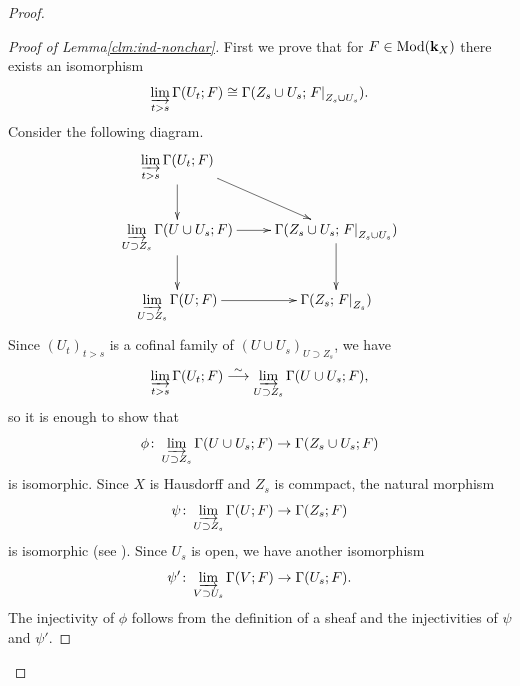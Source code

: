 \begin{proof}
  \begin{proof}[Proof of Lemma\ref{clm:ind-nonchar}]
    First we prove that 
    for \(F\in \Mod(\kk_X)\) 
    there exists an isomorphism
    \begin{equation}\label{eq:qis-claim}
      \indlim[t>s]\Gamma(U_t;F)
      \cong 
      \Gamma(Z_{s}\cup U_{s};\mres[F]{Z_{s}\cup U_{s}}).
    \end{equation}
    Consider the following diagram. 
    \[\vcenter{\xymatrix{
      \indlim[t>s]\Gamma(U_t;F)
      \ar[rd]
      \ar[d]
      &
      \\
      \indlim[U\supset Z_{s}]
      \Gamma(U\cup U_{s};F)
      \ar[d]
      \ar[r]
      &
      \Gamma(Z_{s}\cup U_{s};\mres[F]{Z_{s}\cup U_{s}})
      \ar[d]
      \\
      \indlim[U\supset Z_{s}]
      \Gamma(U;F)
      \ar[r]
      &
      \Gamma(Z_{s};\mres[F]{Z_{s}})
    }}
    \] 
    Since \(\left(U_{t}\right)_{t>s}\) is a 
    cofinal family of \((U\cup U_{s})_{U\supset Z_{s}}\), 
    we have 
    \[
      \indlim[t>s]
      \Gamma(U_{t};F)
      \simarr
      \indlim[U\supset Z_{s}]
      \Gamma(U\cup U_{s};F), 
    \]
    so it is enough to show that
    \[
      \phi\colon\indlim[U\supset Z_{s}]
      \Gamma(U\cup U_{s};F)
      \to
      \Gamma(Z_{s}\cup U_{s};F)
    \]
    is isomorphic.     
    Since \(X\) is Hausdorff and \(Z_{s}\) is commpact, 
    the natural morphism 
    \[
      \psi\colon\indlim[U\supset Z_{s}]\Gamma(U;F)
      \to
      \Gamma(Z_{s};F)
    \]
    is isomorphic (see \cite[Proposition 2.5.1]{KS90}). 
    Since \(U_{s}\) is open, we have another isomorphism 
    \[
      \psi'\colon\indlim[V\supset U_{s}]\Gamma(V;F)
      \to
      \Gamma(U_{s};F).
    \] 
    The injectivity of \(\phi\) follows from 
    the definition of a sheaf 
    and the injectivities of \(\psi\) and \(\psi'\). 


\end{proof}
\end{proof}
